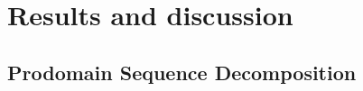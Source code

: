 \documentclass[10pt,letterpaper]{article}
\begin{document}
\section{Results and discussion}


\subsection{Prodomain Sequence Decomposition} 


\end{document}
